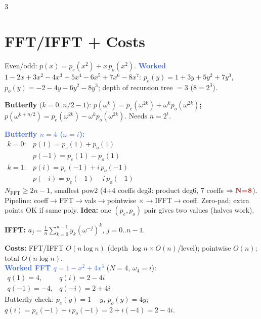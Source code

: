 \documentclass[9pt]{extarticle}
\newcommand{\hl}[1]{\textbf{\textcolor{BrickRed}{#1}}}
\newcommand{\wk}[1]{\textbf{\textcolor{OliveGreen}{#1}}}
\newcommand{\ex}[1]{\textbf{\textcolor{RoyalBlue}{#1}}}
\begin{document}
\begin{multicols}{3}
\section{FFT/IFFT + Costs}
\begin{sloppypar}\raggedright
Even/odd: $p(x){=}p_e(x^2){+}x\,p_o(x^2)$. \ex{Worked} $1{-}2x{+}3x^2{-}4x^3{+}5x^4{-}6x^5{+}7x^6{-}8x^7$: $p_e(y){=}1{+}3y{+}5y^2{+}7y^3$, $p_o(y){=}{-}2{-}4y{-}6y^2{-}8y^3$; depth of recursion tree ${=}3$ ($8{=}2^3$).
\end{sloppypar}
\begin{kbox}\raggedright
\textbf{Butterfly} ($k{=}0..n/2{-}1$): \hl{$p(\omega^k){=}p_e(\omega^{2k}){+}\omega^k p_o(\omega^{2k})$; $p(\omega^{k+n/2}){=}p_e(\omega^{2k}){-}\omega^k p_o(\omega^{2k})$}. Needs $n{=}2^t$.
\end{kbox}
\begin{sloppypar}\raggedright
\ex{Butterfly $n{=}4$ ($\omega{=}i$):}\\
$\begin{array}{ll}
k{=}0: & p(1){=}p_e(1){+}p_o(1)\\
& p({-}1){=}p_e(1){-}p_o(1)\\
k{=}1: & p(i){=}p_e({-}1){+}i\,p_o({-}1)\\
& p({-}i){=}p_e({-}1){-}i\,p_o({-}1)
\end{array}$\\
\hl{$N_{\mathrm{FFT}}\ge2n{-}1$}, smallest pow2 (4+4 coeffs deg3: product deg6, 7 coeffs $\Rightarrow \hl{N{=}8}$). Pipeline: coeff$\to$FFT$\to$vals$\to$pointwise ${\times}\to$IFFT$\to$coeff. Zero-pad; extra points OK if same poly. \wk{Idea:} one $(p_e,p_o)$ pair gives two values (halves work).\\
\end{sloppypar}
\begin{kbox}\raggedright
\textbf{IFFT:} $a_j{=}\frac{1}{n}\sum_{k=0}^{n-1}y_k(\omega^{-j})^k$, $j{=}0..n{-}1$.
\end{kbox}
\begin{sloppypar}\raggedright
\hl{Costs:} FFT/IFFT $O(n\log n)$ (depth $\log n\times O(n)$/level); pointwise $O(n)$; total $O(n\log n)$.\\
\ex{Worked FFT $q{=}1{-}x^2{+}4x^3$} ($N{=}4$, $\omega_4{=}i$):\\
$\begin{array}{ll}
q(1){=}4, & q(i){=}2{-}4i\\
q({-}1){=}{-}4, & q({-}i){=}2{+}4i
\end{array}$\\
Butterfly check: $p_e(y){=}1{-}y$, $p_o(y){=}4y$; $q(i){=}p_e({-}1){+}i\,p_o({-}1){=}2{+}i({-}4){=}2{-}4i$.\\

\end{sloppypar}
\end{multicols}
\end{document}
